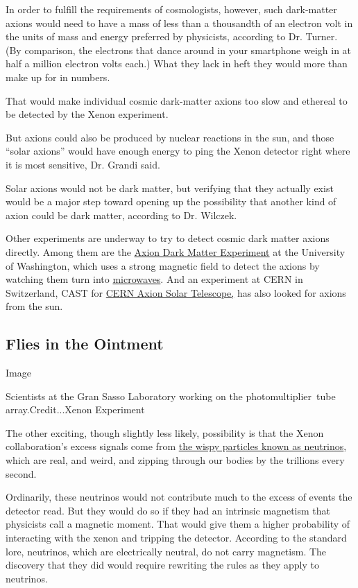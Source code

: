 In order to fulfill the requirements of cosmologists, however, such
dark-matter axions would need to have a mass of less than a thousandth
of an electron volt in the units of mass and energy preferred by
physicists, according to Dr. Turner. (By comparison, the electrons that
dance around in your smartphone weigh in at half a million electron
volts each.) What they lack in heft they would more than make up for in
numbers.

That would make individual cosmic dark-matter axions too slow and
ethereal to be detected by the Xenon experiment.

But axions could also be produced by nuclear reactions in the sun, and
those ``solar axions'' would have enough energy to ping the Xenon
detector right where it is most sensitive, Dr. Grandi said.

Solar axions would not be dark matter, but verifying that they actually
exist would be a major step toward opening up the possibility that
another kind of axion could be dark matter, according to Dr. Wilczek.

Other experiments are underway to try to detect cosmic dark matter
axions directly. Among them are the
\href{https://depts.washington.edu/admx/}{Axion Dark Matter Experiment}
at the University of Washington, which uses a strong magnetic field to
detect the axions by watching them turn into
\href{https://en.wikipedia.org/wiki/Microwave}{microwaves}. And an
experiment at CERN in Switzerland, CAST for
\href{https://home.cern/science/experiments/cast}{CERN Axion Solar
Telescope,} has also looked for axions from the sun.

\hypertarget{flies-in-the-ointment}{%
\subsection{Flies in the Ointment}\label{flies-in-the-ointment}}

Image

Scientists at the Gran Sasso Laboratory working on the
photomultiplier~tube array.Credit...Xenon Experiment

The other exciting, though slightly less likely, possibility is that the
Xenon collaboration's excess signals come from
\href{https://www.nytimes3xbfgragh.onion/2020/04/15/science/physics-neutrino-antimatter-ichikawa-t2k.html}{the
wispy particles known as neutrinos}, which are real, and weird, and
zipping through our bodies by the trillions every second.

Ordinarily, these neutrinos would not contribute much to the excess of
events the detector read. But they would do so if they had an intrinsic
magnetism that physicists call a magnetic moment. That would give them a
higher probability of interacting with the xenon and tripping the
detector. According to the standard lore, neutrinos, which are
electrically neutral, do not carry magnetism. The discovery that they
did would require rewriting the rules as they apply to neutrinos.

